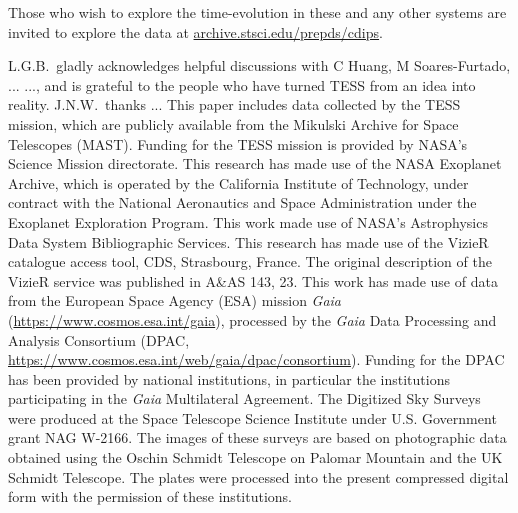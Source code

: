 \documentclass[12pt,twocolumn,tighten]{aastex62}
\newcommand{\stscilink}{\url{archive.stsci.edu/prepds/cdips}}
\begin{document}
Those who wish to explore the
time-evolution in these and any other systems are invited to explore
the data at \stscilink.





\acknowledgements
L.G.B.\ gladly acknowledges helpful discussions with
C Huang, M Soares-Furtado, ...
..., and is
grateful to the people who have turned TESS from an idea into reality.
%
J.N.W.\ thanks ...
%
This paper includes data collected by the TESS mission, which are
publicly available from the Mikulski Archive for Space Telescopes
(MAST).
%
Funding for the TESS mission is provided by NASA's Science Mission
directorate.
%
This research has made use of the NASA Exoplanet Archive, which is
operated by the California Institute of Technology, under contract
with the National Aeronautics and Space Administration under the
Exoplanet Exploration Program.
%
This work made use of NASA's Astrophysics Data System Bibliographic
Services.
%
This research has made use of the VizieR catalogue access tool, CDS,
Strasbourg, France. The original description of the VizieR service was
published in A\&AS 143, 23.
%
This work has made use of data from the European Space Agency (ESA)
mission {\it Gaia} (\url{https://www.cosmos.esa.int/gaia}), processed
by the {\it Gaia} Data Processing and Analysis Consortium (DPAC,
\url{https://www.cosmos.esa.int/web/gaia/dpac/consortium}). Funding
for the DPAC has been provided by national institutions, in particular
the institutions participating in the {\it Gaia} Multilateral
Agreement.
%
The Digitized Sky Surveys were produced at the Space Telescope Science
Institute under U.S. Government grant NAG W-2166. The images of these
surveys are based on photographic data obtained using the Oschin
Schmidt Telescope on Palomar Mountain and the UK Schmidt Telescope.
The plates were processed into the present compressed digital form
with the permission of these institutions.
%
\newline
%
%
\end{document}
